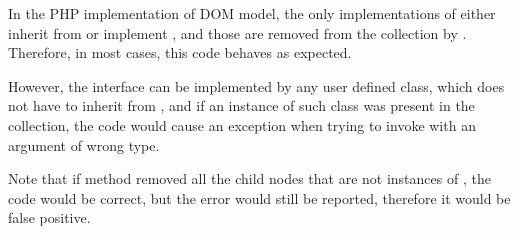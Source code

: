 In the PHP implementation of DOM model, the only implementations of 
 either inherit from  or 
implement , and those are removed 
from the  collection by . 
Therefore, in most cases, this code behaves as expected. 

However, the  interface can be implemented by any user 
defined class, which does not have to inherit from 
, and if an instance of such class was present 
in the  collection, the code would cause an 
exception when trying to invoke  
with an argument of wrong type.

Note that if method  removed 
all the child nodes that are not instances of , 
the code would be correct, but the error would still be reported, 
therefore it would be false positive.


